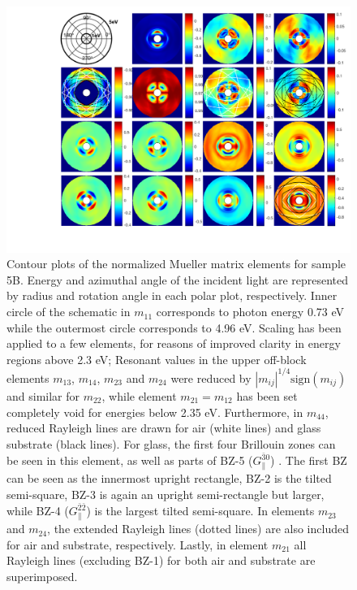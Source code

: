 \begin{figure}[h]
    \label{fig:S5B_N@LSPR}
\end{figure}

\begin{figure}[h]  %
    \centering
    \includegraphics[width=\linewidth, trim=3cm 1cm 0.4cm 0cm, clip]{figures/ch4/S5B/contour/Muller_rot_S5B_COMSOLSIM_55_final(2).pdf}
    \caption{Contour plots of the normalized Mueller matrix elements for sample 5B. Energy and azimuthal angle of the incident light are represented by radius and rotation angle in each polar plot, respectively. Inner circle of the schematic in $m_{11}$ corresponds to photon energy 0.73 eV while the outermost circle corresponds to 4.96 eV. Scaling has been applied to a few elements, for reasons of improved clarity in energy regions above 2.3 eV; Resonant values in the upper off-block elements $m_{13}$, $m_{14}$, $m_{23}$ and $m_{24}$ were reduced by $|m_{ij}|^{1/4}\text{sign}(m_{ij})$ and similar for $m_{22}$, while element $m_{21}=m_{12}$ has been set completely void for energies below 2.35 eV. Furthermore, in $m_{44}$, reduced Rayleigh lines are drawn for air (white lines) and glass substrate (black lines). For glass, the first four Brillouin zones can be seen in this element, as well as parts of BZ-5 ($G_\parallel^{\bar{3}0}$) . The first BZ can be seen as the innermost upright rectangle, BZ-2 is the tilted semi-square, BZ-3 is again an upright semi-rectangle but larger, while BZ-4  ($G_\parallel^{\bar{2}\bar{2}}$) is the largest tilted semi-square. In elements $m_{23}$ and $m_{24}$, the extended Rayleigh lines (dotted lines) are also included for air and substrate, respectively. Lastly, in element $m_{21}$ all Rayleigh lines (excluding BZ-1) for both air and substrate are superimposed.} 
    \label{fig:S5B_contour_MM_exp}
\end{figure}

